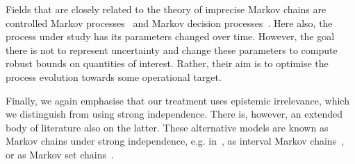 \documentclass[graybox]{svmult}
\begin{document}
Fields that are closely related to the theory of imprecise Markov chains are controlled Markov processes~\cite{guo:2003} and Markov decision processes~\cite{satia:1973, white:1994, itoh:2007, guo:2009}. Here also, the process under study has its parameters changed over time. However, the goal there is not to represent uncertainty and change these parameters to compute robust bounds on quantities of interest. Rather, their aim is to optimise the process evolution towards some operational target.

Finally, we again emphasise that our treatment uses epistemic irrelevance, which we distinguish from using strong independence. There is, however, an extended body of literature also on the latter. These alternative models are known as Markov chains under strong independence, e.g. in~\cite{augustin2013:itip}, as interval Markov chains~\cite{kozine:2002, skulj:2006, skulj:2007, galdino:2013}, or as Markov set chains~\cite{hartfiel:1991, hartfiel:1994, hartfiel:1998}.


\end{document}
